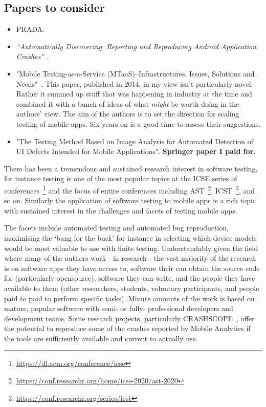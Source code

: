 \subsection{Papers to consider}
\begin{itemize}
    \item PRADA: 
        
    \item \emph{``Automatically Discovering, Reporting and Reproducing Android Application Crashes"}~\citep{moran2016_automatically_drr_android_app_crashes}.
    
    \item "Mobile Testing-as-a-Service (MTaaS)--Infrastructures, Issues, Solutions and Needs"~\cite{gao2014mobile}. This paper, published in 2014, in my view isn't particularly novel. Rather it summed up stuff that was happening in industry at the time and combined it with a bunch of ideas of what \emph{might} be worth doing in the authors' view. The aim of the authors is to set the direction for scaling testing of mobile apps. Six years on is a good time to assess their suggestions.
    \item "The Testing Method Based on Image Analysis for Automated Detection of UI Defects Intended for Mobile Applications". \textbf{Springer paper I paid for.}
\end{itemize}

There has been a tremendous and sustained research interest in software testing, for instance testing is one of the most popular topics at the ICSE series of conferences~\footnote{\url{https://dl.acm.org/conference/icse}} and the focus of entire conferences including AST~\footnote{\url{https://conf.researchr.org/home/icse-2020/ast-2020}}, ICST~\footnote{\url{https://conf.researchr.org/series/icst}}, and so on. Similarly the application of software testing to mobile apps is a rich topic with sustained interest in the challenges and facets of testing mobile apps.

The facets include automated testing and automated bug reproduction, maximising the `bang for the buck' for instance in selecting which device models would be most valuable to use with finite testing. Understandably given the field where many of the authors work - in research - the vast majority of the research is on software apps they have access to, software their can obtain the source code for (particularly opensource), software they can write, and the people they have available to them (other researchers, students, voluntary participants, and people paid to paid to perform specific tasks). Minute amounts of the work is based on mature, popular software with semi- or fully- professional developers and development teams. Some research projects, particularly CRASHSCOPE~\citep{moran2016_automatically_drr_android_app_crashes}, offer the potential to reproduce some of the crashes reported by Mobile Analytics if the tools are sufficiently available and current to actually use.



